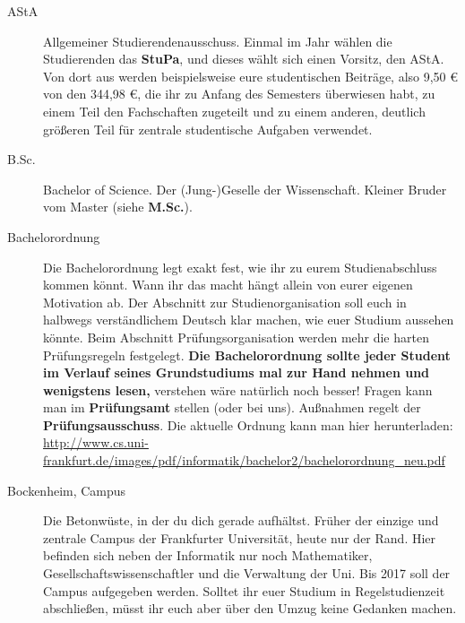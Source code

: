 
\label{glossar}

\begin{description}

 
\item[AStA] Allgemeiner Studierendenausschuss. Einmal im Jahr wählen
die Studierenden das \textbf{StuPa}, und dieses wählt sich einen
Vorsitz, den AStA. Von dort aus werden beispielsweise eure
studentischen Beiträge, also 9,50 \euro{} von den 344,98 \euro{}, die
ihr zu Anfang des Semesters überwiesen habt, zu einem Teil den
Fachschaften zugeteilt und zu einem anderen, deutlich größeren Teil
für zentrale studentische Aufgaben verwendet.


\item[B.Sc.] Bachelor of Science. Der (Jung-)Geselle der Wissenschaft.
Kleiner Bruder vom Master (siehe \textbf{M.Sc.}).


\item[Bachelorordnung] Die Bachelorordnung legt exakt fest, wie ihr zu eurem
Studienabschluss kommen könnt. Wann ihr das macht hängt allein von eurer eigenen
Motivation ab.  Der Abschnitt zur Studienorganisation soll euch in
halbwegs verständlichem Deutsch klar machen, wie euer Studium aussehen könnte.
Beim Abschnitt Prüfungsorganisation werden mehr die harten Prüfungsregeln
festgelegt. \textbf{Die Bachelorordnung sollte jeder Student im Verlauf seines
Grundstudiums mal zur Hand nehmen und wenigstens lesen,} verstehen
wäre natürlich noch besser! Fragen kann man im \textbf{Prüfungsamt} stellen (oder bei uns). Außnahmen regelt der \textbf{Prüfungsausschuss}.
Die aktuelle Ordnung kann man hier herunterladen:
\url{http://www.cs.uni-frankfurt.de/images/pdf/informatik/bachelor2/bachelorordnung\_neu.pdf}


\item[Bockenheim, Campus] Die Betonwüste, in der du dich gerade
aufhältst. Früher der einzige und zentrale Campus der Frankfurter
Universität, heute nur der Rand. Hier befinden sich neben der Informatik nur noch
Mathematiker, Gesellschaftswissenschaftler
und die Verwaltung der Uni. Bis 2017 soll der Campus aufgegeben werden.
Solltet ihr euer Studium in Regelstudienzeit abschließen, müsst ihr euch aber über den Umzug keine Gedanken machen.




\end{description}
